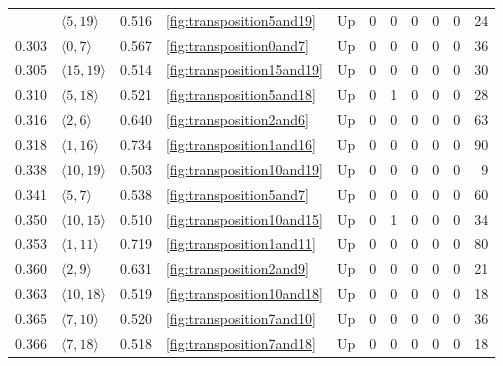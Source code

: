 \documentclass{article}
\begin{document}
\begin{center}
\begin{tabular}{lllllrrrrrr}
\cline{2-11} \cline{3-11} \cline{4-11}
 & $\langle5, 19\rangle$ & 0.516 & \ref{fig:transposition5and19} & Up & 0 & 0 & 0 & 0 & 0 & 24 \\
\cline{1-11} \cline{2-11} \cline{3-11} \cline{4-11}
0.303 & $\langle0, 7\rangle$ & 0.567 & \ref{fig:transposition0and7} & Up & 0 & 0 & 0 & 0 & 0 & 36 \\
\cline{1-11} \cline{2-11} \cline{3-11} \cline{4-11}
0.305 & $\langle15, 19\rangle$ & 0.514 & \ref{fig:transposition15and19} & Up & 0 & 0 & 0 & 0 & 0 & 30 \\
\cline{1-11} \cline{2-11} \cline{3-11} \cline{4-11}
0.310 & $\langle5, 18\rangle$ & 0.521 & \ref{fig:transposition5and18} & Up & 0 & 1 & 0 & 0 & 0 & 28 \\
\cline{1-11} \cline{2-11} \cline{3-11} \cline{4-11}
0.316 & $\langle2, 6\rangle$ & 0.640 & \ref{fig:transposition2and6} & Up & 0 & 0 & 0 & 0 & 0 & 63 \\
\cline{1-11} \cline{2-11} \cline{3-11} \cline{4-11}
0.318 & $\langle1, 16\rangle$ & 0.734 & \ref{fig:transposition1and16} & Up & 0 & 0 & 0 & 0 & 0 & 90 \\
\cline{1-11} \cline{2-11} \cline{3-11} \cline{4-11}
0.338 & $\langle10, 19\rangle$ & 0.503 & \ref{fig:transposition10and19} & Up & 0 & 0 & 0 & 0 & 0 & 9 \\
\cline{1-11} \cline{2-11} \cline{3-11} \cline{4-11}
0.341 & $\langle5, 7\rangle$ & 0.538 & \ref{fig:transposition5and7} & Up & 0 & 0 & 0 & 0 & 0 & 60 \\
\cline{1-11} \cline{2-11} \cline{3-11} \cline{4-11}
0.350 & $\langle10, 15\rangle$ & 0.510 & \ref{fig:transposition10and15} & Up & 0 & 1 & 0 & 0 & 0 & 34 \\
\cline{1-11} \cline{2-11} \cline{3-11} \cline{4-11}
0.353 & $\langle1, 11\rangle$ & 0.719 & \ref{fig:transposition1and11} & Up & 0 & 0 & 0 & 0 & 0 & 80 \\
\cline{1-11} \cline{2-11} \cline{3-11} \cline{4-11}
0.360 & $\langle2, 9\rangle$ & 0.631 & \ref{fig:transposition2and9} & Up & 0 & 0 & 0 & 0 & 0 & 21 \\
\cline{1-11} \cline{2-11} \cline{3-11} \cline{4-11}
0.363 & $\langle10, 18\rangle$ & 0.519 & \ref{fig:transposition10and18} & Up & 0 & 0 & 0 & 0 & 0 & 18 \\
\cline{1-11} \cline{2-11} \cline{3-11} \cline{4-11}
0.365 & $\langle7, 10\rangle$ & 0.520 & \ref{fig:transposition7and10} & Up & 0 & 0 & 0 & 0 & 0 & 36 \\
\cline{1-11} \cline{2-11} \cline{3-11} \cline{4-11}
0.366 & $\langle7, 18\rangle$ & 0.518 & \ref{fig:transposition7and18} & Up & 0 & 0 & 0 & 0 & 0 & 18 \\

\end{tabular}
\end{center}
\end{document}
